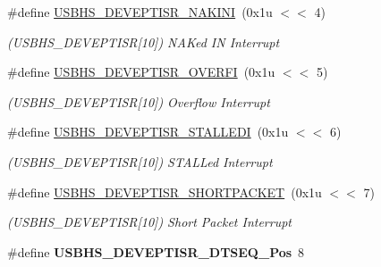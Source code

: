 \begin{DoxyCompactItemize}
\#define \mbox{\hyperlink{group__SAME70__USBHS_ga529fa6ed28b70b37d2fe4ab6e84f172a}{U\+S\+B\+H\+S\+\_\+\+D\+E\+V\+E\+P\+T\+I\+S\+R\+\_\+\+N\+A\+K\+I\+NI}}~(0x1u $<$$<$ 4)
\begin{DoxyCompactList}\small\item\em (U\+S\+B\+H\+S\+\_\+\+D\+E\+V\+E\+P\+T\+I\+SR\mbox{[}10\mbox{]}) N\+A\+Ked IN Interrupt \end{DoxyCompactList}\item 
\mbox{\label{group__SAME70__USBHS_gacb8f42f7eb36900d7a54ab563c416d79}} 
\#define \mbox{\hyperlink{group__SAME70__USBHS_gacb8f42f7eb36900d7a54ab563c416d79}{U\+S\+B\+H\+S\+\_\+\+D\+E\+V\+E\+P\+T\+I\+S\+R\+\_\+\+O\+V\+E\+R\+FI}}~(0x1u $<$$<$ 5)
\begin{DoxyCompactList}\small\item\em (U\+S\+B\+H\+S\+\_\+\+D\+E\+V\+E\+P\+T\+I\+SR\mbox{[}10\mbox{]}) Overflow Interrupt \end{DoxyCompactList}\item 
\mbox{\label{group__SAME70__USBHS_ga8c7202988532c09acf4906a50eb93b1e}} 
\#define \mbox{\hyperlink{group__SAME70__USBHS_ga8c7202988532c09acf4906a50eb93b1e}{U\+S\+B\+H\+S\+\_\+\+D\+E\+V\+E\+P\+T\+I\+S\+R\+\_\+\+S\+T\+A\+L\+L\+E\+DI}}~(0x1u $<$$<$ 6)
\begin{DoxyCompactList}\small\item\em (U\+S\+B\+H\+S\+\_\+\+D\+E\+V\+E\+P\+T\+I\+SR\mbox{[}10\mbox{]}) S\+T\+A\+L\+Led Interrupt \end{DoxyCompactList}\item 
\mbox{\label{group__SAME70__USBHS_ga772ac931e2e8399d48549904ea66137c}} 
\#define \mbox{\hyperlink{group__SAME70__USBHS_ga772ac931e2e8399d48549904ea66137c}{U\+S\+B\+H\+S\+\_\+\+D\+E\+V\+E\+P\+T\+I\+S\+R\+\_\+\+S\+H\+O\+R\+T\+P\+A\+C\+K\+ET}}~(0x1u $<$$<$ 7)
\begin{DoxyCompactList}\small\item\em (U\+S\+B\+H\+S\+\_\+\+D\+E\+V\+E\+P\+T\+I\+SR\mbox{[}10\mbox{]}) Short Packet Interrupt \end{DoxyCompactList}\item 
\mbox{\label{group__SAME70__USBHS_gac0b20e7f751dce14b2a533e177695489}} 
\#define {\bfseries U\+S\+B\+H\+S\+\_\+\+D\+E\+V\+E\+P\+T\+I\+S\+R\+\_\+\+D\+T\+S\+E\+Q\+\_\+\+Pos}~8

\end{DoxyCompactItemize}
